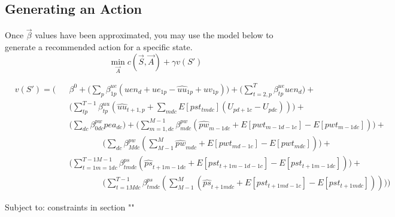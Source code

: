 \subsection{Generating an Action}
Once $\vec{\beta}$ values have been approximated, you may use the model below to generate a recommended action for a specific state.
\begin{equation*}
	\min_{\vec{A}} c(\vec{S}, \vec{A}) + \gamma v(S')
\end{equation*}	

\begin{equation}\begin{alignedat}{10}
		&	v(S') = \Bigg( 
		&& 	\beta^0 + 
		\bigg( \sum_{p} \beta_{1p}^{ue} 
		(uen_{d} + ue_{1p} - \hat{uu}_{1p} + uv_{1p}) \bigg)+
		\bigg( \sum_{t=2,p}^{T} \beta_{tp}^{ue} uen_{d} \bigg)+ \\
		&	&& 	\bigg( \sum_{tp}^{T-1} \beta_{tp}^{uu} 
		( \hat{uu}_{t+1,p} + \sum_{mdc} E[pst_{tmdc}] (U_{pd+1c} - U_{pdc})) \bigg) + \\
		&	&&	\bigg( \sum_{dc} \beta_{0dc}^{pw} pea_{dc} \bigg) +
		\bigg( \sum_{m=1,dc}^{M-1} \beta_{mdc}^{pw} 
		(\hat{pw}_{m-1dc} + E[pwt_{m-1d-1c}] - E[pwt_{m-1dc}]) \bigg) + \\
		&	&&	\qquad \qquad \bigg( \sum_{dc} \beta_{Mdc}^{pw} 
		(\sum_{M-1}^{M} \hat{pw}_{mdc} + E[pwt_{md-1c}] - E[pwt_{mdc}])\bigg) + \\
		& 	&&	\bigg( \sum_{t=1m=1dc}^{T-1M-1} \beta_{tmdc}^{ps} 
		(\hat{ps}_{t+1m-1dc} + E[pst_{t+1m-1d-1c}] - E[pst_{t+1m-1dc}]) \bigg) + \\	
		&	&&	\qquad \qquad \bigg( \sum_{t=1Mdc}^{T-1} \beta_{tmdc}^{ps} 
		(\sum_{M-1}^{M} (\hat{ps}_{t+1mdc} + E[pst_{t+1md-1c}] - E[pst_{t+1mdc}])) \bigg)
		\Bigg)
	\end{alignedat}
\end{equation}

Subject to:
constraints in section ""
